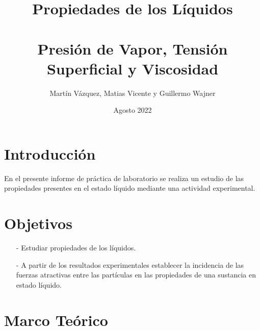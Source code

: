 \documentclass{article}
\begin{document}
\title{\textbf{Propiedades de los Líquidos}
\\
\text{\phantom{xd}}
\\
\large Presión de Vapor, Tensión Superficial y Viscosidad}
\author{Martín Vázquez, Matias Vicente y Guillermo Wajner}
\date{Agosto 2022}

\maketitle

\section{Introducci\'{o}n}

En el presente informe de pr\'{a}ctica de laboratorio se realiza un estudio de las propiedades presentes en el estado líquido mediante una actividad experimental.

\section{Objetivos}

\begin{itemize}
    \item[-]Estudiar propiedades de los líquidos.
    \item[-]A partir de los resultados experimentales establecer la incidencia de las fuerzas atractivas entre las partículas en las propiedades de una sustancia en estado líquido.
\end{itemize}

\section{Marco Te\'{o}rico}
\end{document}
